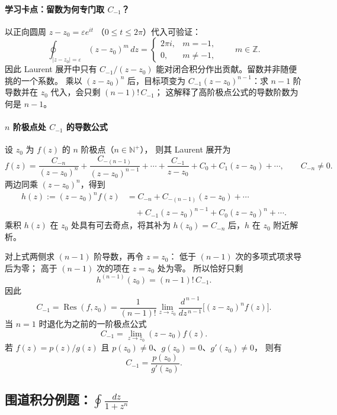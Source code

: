 
\paragraph{学习卡点：留数为何专门取 $C_{-1}$？}
以正向圆周 $z-z_0=\varepsilon e^{it}$
（$0\le t\le2\pi$）代入可验证：
\[
 \oint_{|z-z_0|=\varepsilon}(z-z_0)^m\,dz
 =\begin{cases}2\pi i,&m=-1,\\0,&m\ne-1,\end{cases}
 \qquad m\in\mathbb Z.
\]
因此 Laurent 展开中只有 $C_{-1}/(z-z_0)$
能对闭合积分作出贡献。留数并非随便挑的一个系数。
乘以 $(z-z_0)^n$ 后，目标项变为
$C_{-1}(z-z_0)^{n-1}$：求 $n-1$ 阶导数并在
$z_0$ 代入，会只剩 $(n-1)!\,C_{-1}$；
这解释了高阶极点公式的导数阶数为何是 $n-1$。


\paragraph{$n$ 阶极点处 $C_{-1}$ 的导数公式}
设 $z_0$ 为 $f(z)$ 的 $n$ 阶极点（$n\in\mathbb N^+$），
则其 Laurent 展开为
\[
  f(z)=\frac{C_{-n}}{(z-z_0)^n}
  +\frac{C_{-(n-1)}}{(z-z_0)^{n-1}}
  +\cdots+\frac{C_{-1}}{z-z_0}
  +C_0+C_1(z-z_0)+\cdots,
  \qquad C_{-n}\ne0.
\]
两边同乘 $(z-z_0)^n$，得到
\begin{align*}
  h(z):=(z-z_0)^n f(z)
   &=C_{-n}+C_{-(n-1)}(z-z_0)+\cdots\\
   &\quad+C_{-1}(z-z_0)^{n-1}
   +C_0(z-z_0)^n+\cdots.
\end{align*}
乘积 $h(z)$ 在 $z_0$ 处具有可去奇点，将其补为
$h(z_0)=C_{-n}$ 后，$h$ 在 $z_0$ 附近解析。

对上式两侧求 $(n-1)$ 阶导数，再令 $z=z_0$：
低于 $(n-1)$ 次的多项式项求导后为零；
高于 $(n-1)$ 次的项在 $z=z_0$ 处为零。
所以恰好只剩
\[
  h^{(n-1)}(z_0)=(n-1)!\,C_{-1}.
\]
因此
\[
  \boxed{
    C_{-1}=\operatorname{Res}(f,z_0)
    =\frac{1}{(n-1)!}
       \lim_{z\to z_0}
       \frac{d^{\,n-1}}{dz^{\,n-1}}
       \bigl[(z-z_0)^n f(z)\bigr]
  }.
\]
当 $n=1$ 时退化为之前的一阶极点公式
\[
  C_{-1}=\lim_{z\to z_0}(z-z_0)f(z).
\]
若 $f(z)=p(z)/g(z)$ 且
$p(z_0)\ne0$、$g(z_0)=0$、$g'(z_0)\ne0$，
则有
\[
  C_{-1}=\frac{p(z_0)}{g'(z_0)}.
\]

\subsection*{围道积分例题：$\displaystyle\oint\frac{dz}{1+z^n}$}
